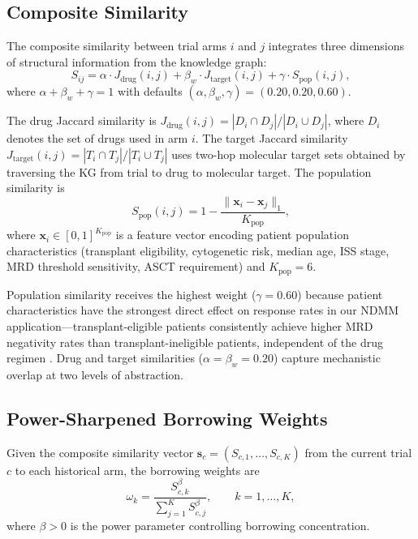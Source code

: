 \documentclass[12pt]{article}
\newcommand{\Jdrug}{J_{\mathrm{drug}}}
\newcommand{\Jtarget}{J_{\mathrm{target}}}
\newcommand{\Spop}{S_{\mathrm{pop}}}
\begin{document}
\subsection{Composite Similarity}
\label{sec:similarity}

The composite similarity between trial arms $i$ and $j$ integrates three dimensions of structural information from the knowledge graph:
\begin{equation}
S_{ij} = \alpha \cdot \Jdrug(i,j) + \beta_w \cdot \Jtarget(i,j) + \gamma \cdot \Spop(i,j),
\label{eq:composite_sim}
\end{equation}
where $\alpha + \beta_w + \gamma = 1$ with defaults $(\alpha, \beta_w, \gamma) = (0.20, 0.20, 0.60)$.

The drug Jaccard similarity is $\Jdrug(i,j) = |D_i \cap D_j| / |D_i \cup D_j|$, where $D_i$ denotes the set of drugs used in arm $i$. The target Jaccard similarity $\Jtarget(i,j) = |T_i \cap T_j| / |T_i \cup T_j|$ uses two-hop molecular target sets obtained by traversing the KG from trial to drug to molecular target. The population similarity is
\begin{equation}
\Spop(i,j) = 1 - \frac{\|\mathbf{x}_i - \mathbf{x}_j\|_1}{K_{\mathrm{pop}}},
\label{eq:pop_sim}
\end{equation}
where $\mathbf{x}_i \in [0,1]^{K_{\mathrm{pop}}}$ is a feature vector encoding patient population characteristics (transplant eligibility, cytogenetic risk, median age, ISS stage, MRD threshold sensitivity, ASCT requirement) and $K_{\mathrm{pop}} = 6$.

Population similarity receives the highest weight ($\gamma = 0.60$) because patient characteristics have the strongest direct effect on response rates in our NDMM application---transplant-eligible patients consistently achieve higher MRD negativity rates than transplant-ineligible patients, independent of the drug regimen \citep[see, e.g.,][]{viele2014use}. Drug and target similarities ($\alpha = \beta_w = 0.20$) capture mechanistic overlap at two levels of abstraction.

\subsection{Power-Sharpened Borrowing Weights}
\label{sec:power_weights}

Given the composite similarity vector $\mathbf{s}_c = (S_{c,1}, \ldots, S_{c,K})$ from the current trial $c$ to each historical arm, the borrowing weights are
\begin{equation}
\omega_k = \frac{S_{c,k}^\beta}{\sum_{j=1}^{K} S_{c,j}^\beta}, \qquad k = 1, \ldots, K,
\label{eq:power_weights}
\end{equation}
where $\beta > 0$ is the power parameter controlling borrowing concentration.
\end{document}
